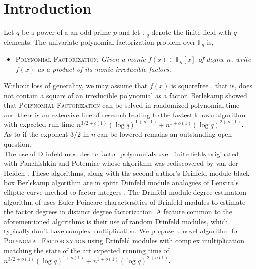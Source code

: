\documentclass{article}
\theoremstyle{plain}
\theoremstyle{definition}
\def\F{\ensuremath{\mathbb{F}}}
\begin{document}
\section{Introduction}
Let $q$ be a power of a an odd prime $p$ and let $\F_q$ denote the finite field with $q$ elements. The univariate polynomial factorization problem over $\F_q$ is,\\
\begin{itemize}
 \item \textsc{Polynomial Factorization:} \textit{Given a monic $f(x) \in \mathbb{F}_q[x]$ of degree $n$, write $f(x)$ as a product of its monic irreducible factors.}\\
\end{itemize}
Without loss of generality, we may assume that $f(x)$ is squarefree \cite{knu,yun}, that is, does not contain a square of an irreducible polynomial as a factor. Berlekamp showed that \textsc{Polynomial Factorization} can be solved in randomized polynomial time \cite{ber} and there is an extensive line of research \cite{cz,gs,ks} leading to the fastest known algorithm \cite{ku} with expected run time $n^{3/2+o(1)} (\log q)^{1+o(1)}+n^{1+o(1)} (\log q)^{2+o(1)}$. As to if the exponent $3/2$ in $n$ can be lowered remains an outstanding open question.\\

The use of Drinfeld modules to factor polynomials over finite fields originated with Panchishkin and Potemine \cite{pp} whose algorithm was rediscovered by van der Heiden \cite{vdH}. These algorithms, along with the second author's Drinfeld module black box Berlekamp algorithm \cite{nar} are in spirit Drinfeld module analogues of Lenstra's elliptic curve method to factor integers \cite{len}. The Drinfeld module degree estimation algorithm of \cite{nar} uses Euler-Poincare charactersitics of Drinfeld modules to estimate the factor degrees in distinct degree factorization. A feature common to the aforementioned algorithms is their use of random Drinfeld modules, which typically don't have complex multiplication. We propose a novel algorithm for \textsc{Polynomial Factorization} using Drinfeld modules with complex multiplication matching the state of the art expected running time of $n^{3/2+o(1)} (\log q)^{1+o(1)}+n^{1+o(1)} (\log q)^{2+o(1)}$.\\
\end{document}
